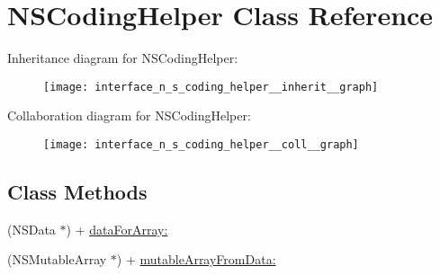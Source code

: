 \hypertarget{interface_n_s_coding_helper}{\section{N\-S\-Coding\-Helper Class Reference}
\label{interface_n_s_coding_helper}
}


Inheritance diagram for N\-S\-Coding\-Helper\-:\nopagebreak
\begin{figure}[H]
\begin{center}
\leavevmode
\texttt{[image: interface\_n\_s\_coding\_helper\_\_inherit\_\_graph]}
\end{center}
\end{figure}


Collaboration diagram for N\-S\-Coding\-Helper\-:\nopagebreak
\begin{figure}[H]
\begin{center}
\leavevmode
\texttt{[image: interface\_n\_s\_coding\_helper\_\_coll\_\_graph]}
\end{center}
\end{figure}
\subsection*{Class Methods}
\begin{DoxyCompactItemize}
\item 
(N\-S\-Data $\ast$) + \hyperlink{interface_n_s_coding_helper_ae6726effc13feb81846941f9e0318b38}{data\-For\-Array\-:}
\item 
(N\-S\-Mutable\-Array $\ast$) + \hyperlink{interface_n_s_coding_helper_a9808f1de7079b9360beaf6b48c857663}{mutable\-Array\-From\-Data\-:}
\end{DoxyCompactItemize}


